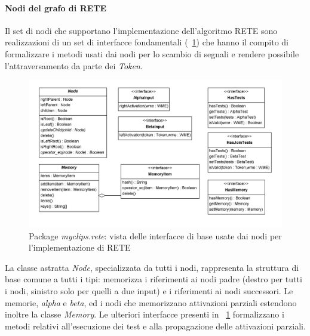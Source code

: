 \paragraph{Nodi del grafo di RETE}

Il set di nodi che supportano l'implementazione dell'algoritmo RETE sono realizzazioni di un set di interfacce fondamentali (\figurename~\ref{fig:class-myclips-rete-interfaces}) che hanno il compito di formalizzare i metodi usati dai nodi per lo scambio di segnali e rendere possibile l'attraversamento da parte dei \emph{Token}.

\begin{figure}
\centering
\includegraphics[width=1\textwidth]{Immagini/Capitolo3/Classi/myclips_rete_Interfacce.png}
\caption{Package \emph{myclips.rete}: vista delle interfacce di base usate dai nodi per l'implementazione di RETE}\label{fig:class-myclips-rete-interfaces}
\end{figure}

La classe astratta \emph{Node}, specializzata da tutti i nodi, rappresenta la struttura di base comune a tutti i tipi: memorizza i riferimenti ai nodi padre (destro per tutti i nodi, sinistro solo per quelli a due input) e i riferimenti ai nodi successori. Le memorie, \emph{alpha} e \emph{beta}, ed i nodi che memorizzano attivazioni parziali estendono inoltre la classe \emph{Memory}. Le ulteriori interfacce presenti in \figurename~\ref{fig:class-myclips-rete-interfaces} formalizzano i metodi relativi all'esecuzione dei test e alla propagazione delle attivazioni parziali.

